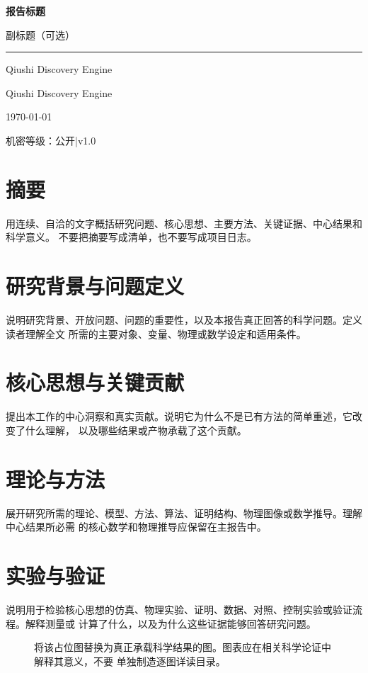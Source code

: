 \documentclass[11pt,a4paper]{ctexart}
\providecommand{\ReportTitle}{报告标题}
\providecommand{\ReportSubtitle}{副标题（可选）}
\providecommand{\ReportAuthor}{Qiushi Discovery Engine}
\providecommand{\ReportOrganization}{Qiushi Discovery Engine}
\providecommand{\ReportClassification}{公开}
\providecommand{\ReportVersion}{v1.0}
\providecommand{\ReportDate}{\today}
\providecommand{\MakeReportCover}{%
  \begin{titlepage}
  \pagecolor{ReportPrimary}\afterpage{\nopagecolor}
  \color{white}
  \vspace*{2.5cm}
  \begin{flushleft}
    {\Huge\bfseries \ReportTitle\par}\vspace{0.6cm}
    {\Large\color{ReportLight}\ReportSubtitle\par}\vspace{1.5cm}
    {\color{ReportLight}\rule{6cm}{0.6pt}}
  \end{flushleft}
  \vfill
  \begin{flushleft}
    {\large \ReportAuthor\par}\vspace{0.2cm}
    {\normalsize\color{ReportLight}\ReportOrganization\par}\vspace{0.6cm}
    {\normalsize\color{ReportLight}\ReportDate\par}\vspace{0.4cm}
    {\small\color{ReportLight}机密等级：\ReportClassification\quad|\quad\ReportVersion\par}
  \end{flushleft}
  \end{titlepage}}
\begin{document}
\hypersetup{pageanchor=false}
\MakeReportCover
\hypersetup{pageanchor=true}
\setcounter{page}{1}

\thispagestyle{plain}
\tableofcontents
\newpage

\section*{摘要}

用连续、自洽的文字概括研究问题、核心思想、主要方法、关键证据、中心结果和科学意义。
不要把摘要写成清单，也不要写成项目日志。

\newpage

\section{研究背景与问题定义}

说明研究背景、开放问题、问题的重要性，以及本报告真正回答的科学问题。定义读者理解全文
所需的主要对象、变量、物理或数学设定和适用条件。

\section{核心思想与关键贡献}

提出本工作的中心洞察和真实贡献。说明它为什么不是已有方法的简单重述，它改变了什么理解，
以及哪些结果或产物承载了这个贡献。

\section{理论与方法}

展开研究所需的理论、模型、方法、算法、证明结构、物理图像或数学推导。理解中心结果所必需
的核心数学和物理推导应保留在主报告中。


\section{实验与验证}

说明用于检验核心思想的仿真、物理实验、证明、数据、对照、控制实验或验证流程。解释测量或
计算了什么，以及为什么这些证据能够回答研究问题。

\begin{figure}[htbp]
\centering
\fbox{\rule{0pt}{1.8in}\rule{0.85\textwidth}{0pt}}
\caption{将该占位图替换为真正承载科学结果的图。图表应在相关科学论证中解释其意义，不要
单独制造逐图详读目录。}
\label{fig:report-example-zh}
\end{figure}
\end{document}
